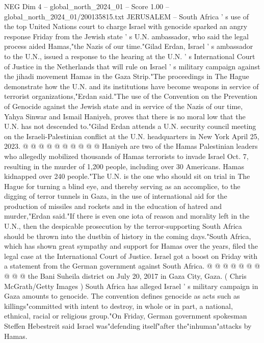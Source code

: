 \begin{textsample}{NEG Dim 4 – global\_north\_2024\_01 – Score 1.00 – global\_north\_2024\_01/200135815.txt}  \label{ex:f4_neg_120}
JERUSALEM -- South Africa ' s use of the top United Nations court to charge Israel with genocide sparked an angry response Friday from the Jewish state ' s U.N. ambassador, who said the legal process aided Hamas,"the Nazis of our time."Gilad Erdan, Israel ' s ambassador to the U.N., issued a response to the hearing at the U.N. ' s International Court of Justice in the Netherlands that will rule on Israel ' s military campaign against the jihadi movement Hamas in the Gaza Strip."The proceedings in The Hague demonstrate how the U.N. and its institutions have become weapons in service of terrorist organizations,"Erdan said."The use of the Convention on the Prevention of Genocide against the Jewish state and in service of the Nazis of our time, Yahya Sinwar and Ismail Haniyeh, proves that there is no moral low that the U.N. has not descended to."Gilad Erdan attends a U.N. security council meeting on the Israeli-Palestinian conflict at the U.N. headquarters in New York April 25, 2023. @ @ @ @ @ @ @ @ @ @ Haniyeh are two of the Hamas Palestinian leaders who allegedly mobilized thousands of Hamas terrorists to invade Israel Oct. 7, resulting in the murder of 1,200 people, including over 30 Americans.
Hamas kidnapped over 240 people."The U.N. is the one who should sit on trial in The Hague for turning a blind eye, and thereby serving as an accomplice, to the digging of terror tunnels in Gaza, in the use of international aid for the production of missiles and rockets and in the education of hatred and murder,"Erdan said."If there is even one iota of reason and morality left in the U.N., then the despicable prosecution by the terror-supporting South Africa should be thrown into the dustbin of history in the coming days."South Africa, which has shown great sympathy and support for Hamas over the years, filed the legal case at the International Court of Justice.
Israel got a boost on Friday with a statement from the German government against South Africa. @ @ @ @ @ @ @ @ @ @ the Bani Suheila district on July 20, 2017 in Gaza City, Gaza. ( Chris McGrath/Getty Images ) South Africa has alleged Israel ' s military campaign in Gaza amounts to genocide.
The convention defines genocide as acts such as killings"committed with intent to destroy, in whole or in part, a national, ethnical, racial or religious group."On Friday, German government spokesman Steffen Hebestreit said Israel was"defending itself"after the"inhuman"attacks by Hamas.

\end{textsample}
